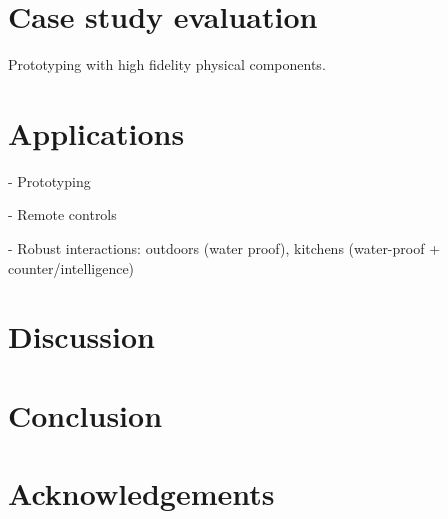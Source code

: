 \documentclass{ubicomp2013}
\begin{document}
\section{Case study evaluation}
Prototyping with high fidelity physical components.


\section{Applications}

- Prototyping

- Remote controls

- Robust interactions: outdoors (water proof), kitchens (water-proof + counter/intelligence)

\section{Discussion}

\section{Conclusion}

\section{Acknowledgements}




\end{document}
